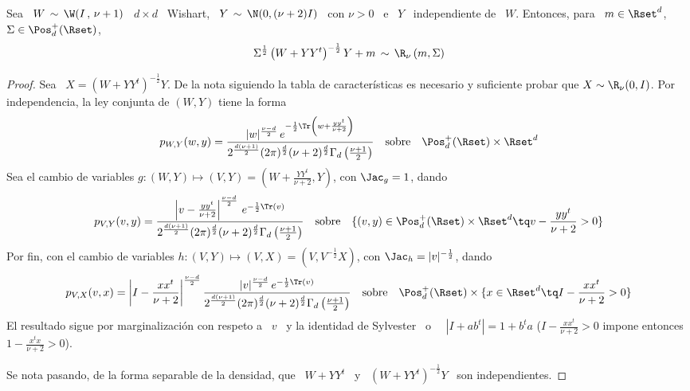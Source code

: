 \begin{lema}\label{Lem:MP:StudentWishart}

%
  Sea \ $W \, \sim \, \W( I \, ,  \, \nu+1)$ \ $d \times d$ \ Wishart, \ $Y \,
  \sim  \, \N(0, (\nu+2)  I)$  \ con  $\nu  >  0$ \  e  \ $Y$  \  independiente de  \
  $W$. Entonces, para \ $m \in \Rset^d$, \ $\Sigma \in \Pos_d^+(\Rset)$,
  \[
  \Sigma^{\frac12}  \left(  W +  Y  Y^t  \right)^{-\frac12} Y  +  m  \, \sim  \,
  \R_\nu\left( m , \Sigma \right)
  \]
\end{lema}
\begin{proof}
  Sea \ $X  = \left( W + Y  Y^t \right)^{-\frac12} Y$.  De la  nota siguiendo la
  tabla  de caracter\'isticas  es  necesario  y suficiente  probar  que $X  \sim
  \R_\nu(0,I)$.  Por independencia, la ley conjunta de $(W,Y)$ tiene la forma
  \[
  p_{W,Y}(w,y)  =  \frac{|w|^{\frac{\nu-d}{2}}  \,  e^{-\frac12  \Tr\left(  w  +
        \frac{y      y^t}{\nu+2}\right)}}{2^{\frac{d       (\nu+1)}{2}}      (2
    \pi)^{\frac{d}{2}}   (\nu+2)^{\frac{d}{2}}   \Gamma_d\left(  \frac{\nu+1}{2}
    \right)} \quad \mbox{sobre} \quad \Pos_d^+(\Rset) \times \Rset^d
  \]
  Sea  el cambio  de variables  $g: (W,Y)  \mapsto (V,Y)  = \left(  W  + \frac{Y
      Y^t}{\nu+2} , Y \right)$, con $\Jac_g = 1$, dando
  \[
  p_{V,Y}(v,y) = \frac{\left|  v - \frac{y y^t}{\nu+2} \right|^{\frac{\nu-d}{2}}
    \,   e^{-\frac12   \Tr\left(    v   \right)}}{2^{\frac{d   (\nu+1)}{2}}   (2
    \pi)^{\frac{d}{2}}   (\nu+2)^{\frac{d}{2}}   \Gamma_d\left(  \frac{\nu+1}{2}
    \right)}  \quad  \mbox{sobre} \quad  \{  (v,y)  \in \Pos_d^+(\Rset)  \times
  \Rset^d \tq v - \frac{y y^t}{\nu+2} > 0 \}
  \]
  Por fin,  con el  cambio de  variables $h: (V,Y)  \mapsto (V,X)  = \left(  V ,
    V^{-\frac12} X \right)$, con $\Jac_h = |v|^{-\frac12}$, dando
 \[
  p_{V,X}(v,x) = \left|  I - \frac{x x^t}{\nu+2} \right|^{\frac{\nu-d}{2}} \frac{|v|^{\frac{\nu-d}{2}}
    \,   e^{-\frac12   \Tr\left(    v   \right)}}{2^{\frac{d   (\nu+1)}{2}}   (2
    \pi)^{\frac{d}{2}}   (\nu+2)^{\frac{d}{2}}   \Gamma_d\left(  \frac{\nu+1}{2}
    \right)} \quad \mbox{sobre}  \quad \Pos_d^+(\Rset)  \times \{  x \in 
  \Rset^d \tq I - \frac{x x^t}{\nu+2} > 0 \}
  \]
  El resultado sigue por marginalizaci\'on con  respeto a \ $v$ \ y la identidad
  de Sylvester~\cite{Syl51} o~\cite[\S~18.1]{Har08} \  $\left| I + a b^t \right|
  = 1  + b^t a$ ($I  - \frac{x x^t}{\nu+2} >  0$ impone entonces  $1 - \frac{x^t
    x}{\nu+2} > 0$).

  Se nota pasando, de  la forma separable de la densidad, que \  $W+Y Y^t$ \ y \
  $(W+Y Y^t)^{-\frac12} Y$ \ son independientes.
\end{proof}

